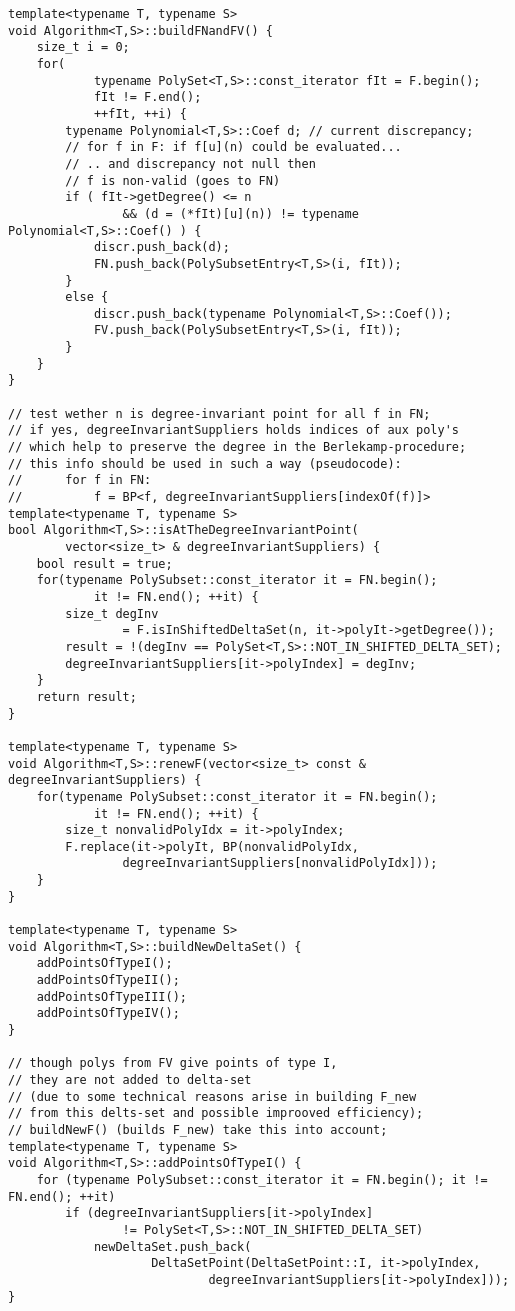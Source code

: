 \begin{lstlisting}
template<typename T, typename S>
void Algorithm<T,S>::buildFNandFV() {
    size_t i = 0;
    for(
            typename PolySet<T,S>::const_iterator fIt = F.begin();
            fIt != F.end();
            ++fIt, ++i) {
        typename Polynomial<T,S>::Coef d; // current discrepancy;
        // for f in F: if f[u](n) could be evaluated...
        // .. and discrepancy not null then 
        // f is non-valid (goes to FN)
        if ( fIt->getDegree() <= n
                && (d = (*fIt)[u](n)) != typename Polynomial<T,S>::Coef() ) {
            discr.push_back(d);
            FN.push_back(PolySubsetEntry<T,S>(i, fIt));
        }
        else {
            discr.push_back(typename Polynomial<T,S>::Coef());
            FV.push_back(PolySubsetEntry<T,S>(i, fIt));
        }
    }
}

// test wether n is degree-invariant point for all f in FN;
// if yes, degreeInvariantSuppliers holds indices of aux poly's
// which help to preserve the degree in the Berlekamp-procedure;
// this info should be used in such a way (pseudocode):
//      for f in FN:
//          f = BP<f, degreeInvariantSuppliers[indexOf(f)]>
template<typename T, typename S>
bool Algorithm<T,S>::isAtTheDegreeInvariantPoint(
        vector<size_t> & degreeInvariantSuppliers) {
    bool result = true;
    for(typename PolySubset::const_iterator it = FN.begin();
            it != FN.end(); ++it) {
        size_t degInv
                = F.isInShiftedDeltaSet(n, it->polyIt->getDegree());
        result = !(degInv == PolySet<T,S>::NOT_IN_SHIFTED_DELTA_SET);
        degreeInvariantSuppliers[it->polyIndex] = degInv;
    }
    return result;
}

template<typename T, typename S>
void Algorithm<T,S>::renewF(vector<size_t> const & degreeInvariantSuppliers) {
    for(typename PolySubset::const_iterator it = FN.begin();
            it != FN.end(); ++it) {
        size_t nonvalidPolyIdx = it->polyIndex;
        F.replace(it->polyIt, BP(nonvalidPolyIdx,
                degreeInvariantSuppliers[nonvalidPolyIdx]));
    }
}

template<typename T, typename S>
void Algorithm<T,S>::buildNewDeltaSet() {
    addPointsOfTypeI();
    addPointsOfTypeII();
    addPointsOfTypeIII();
    addPointsOfTypeIV();
}

// though polys from FV give points of type I,
// they are not added to delta-set
// (due to some technical reasons arise in building F_new
// from this delts-set and possible improoved efficiency);
// buildNewF() (builds F_new) take this into account;
template<typename T, typename S>
void Algorithm<T,S>::addPointsOfTypeI() {
    for (typename PolySubset::const_iterator it = FN.begin(); it != FN.end(); ++it)
        if (degreeInvariantSuppliers[it->polyIndex]
                != PolySet<T,S>::NOT_IN_SHIFTED_DELTA_SET)
            newDeltaSet.push_back(
                    DeltaSetPoint(DeltaSetPoint::I, it->polyIndex,
                            degreeInvariantSuppliers[it->polyIndex]));
}


\end{lstlisting}
